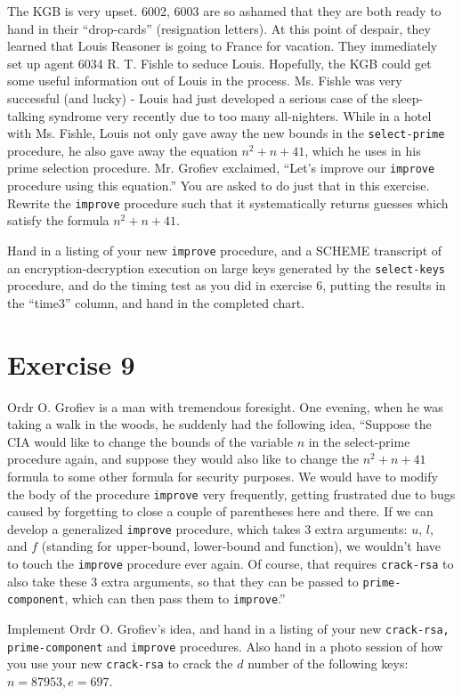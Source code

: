 The KGB is very upset.  6002, 6003 are so ashamed that they are
both ready to hand in their ``drop-cards'' (resignation letters).  At this
point of despair, they learned that Louis Reasoner is going to France for
vacation.  They immediately set up agent 6034 R. T. Fishle to
seduce
Louis.  Hopefully, the KGB could get some useful information out of Louis in
the process.  Ms. Fishle was very successful (and lucky) - Louis had
just developed a serious case of the sleep-talking syndrome very recently
due to too many
all-nighters.  While in a hotel with Ms. Fishle, Louis
not only gave away the new bounds in the {\tt select-prime} procedure,
he also gave away the equation $n^2+n+41$, which he uses
in his prime selection procedure.  Mr. Grofiev exclaimed, ``Let's improve
our {\tt improve} procedure using this equation.''  You are asked to do
just that in this exercise.  Rewrite the {\tt improve} procedure such
that it
systematically returns guesses which satisfy the formula $n^2+n+41$.

Hand in a listing of your new {\tt improve} procedure, and a SCHEME
transcript
of an encryption-decryption execution on large keys generated by the
{\tt select-keys} procedure, and do the timing test as you did in
exercise 6,
putting the results in the ``time3'' column, and hand in the completed
chart.

\section{Exercise 9}

Ordr O. Grofiev is a man with tremendous foresight.  One evening, when
he was taking a walk in the woods, he suddenly had the following idea,
``Suppose the CIA would like to change the bounds of the variable $n$ in
the select-prime procedure again, and suppose they would also like to
change the $n^2+n+41$ formula to some other formula for security
purposes. We would have to modify the body of the procedure {\tt improve}
very frequently,
getting frustrated due to bugs caused by forgetting to close a couple
of parentheses here and there.  If we can develop a generalized
{\tt improve}  procedure, which takes 3 extra arguments: $u$, $l$, and $f$
(standing
for upper-bound, lower-bound and function), we wouldn't have to touch
the {\tt improve} procedure ever again.  Of course, that requires
{\tt crack-rsa}
to also take these 3 extra arguments, so that they can be passed to
{\tt prime-component}, which can then pass them to {\tt improve}.''

Implement Ordr O. Grofiev's idea, and hand in a listing of your new
{\tt crack-rsa, prime-component}  and {\tt improve} procedures.  Also
hand in
a photo session of how you use your new {\tt crack-rsa} to crack
the $d$ number of the following keys: $n = 87953, e = 697$.


